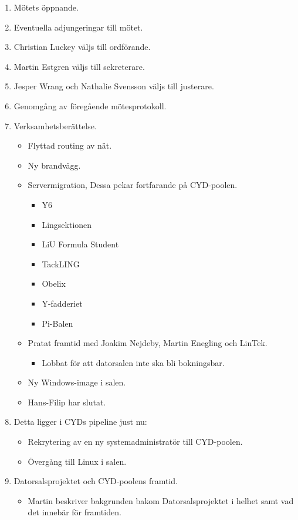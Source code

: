 \documentclass[a4paper,12pt]{article}
\begin{document}
\begin{enumerate}
\item Mötets öppnande.
\item Eventuella adjungeringar till mötet.
\item Christian Luckey väljs till ordförande.
\item Martin Estgren väljs till sekreterare.
\item Jesper Wrang och Nathalie Svensson väljs till justerare.
\item Genomgång av föregående mötesprotokoll.
\item Verksamhetsberättelse.
	\begin{itemize}
	\item Flyttad routing av nät.
	\item Ny brandvägg.
	\item Servermigration, Dessa pekar fortfarande på CYD-poolen.
		\begin{itemize}
		\item Y6
		\item Lingsektionen
		\item LiU Formula Student
		\item TackLING
		\item Obelix
		\item Y-fadderiet
		\item Pi-Balen
		\end{itemize}
	\item Pratat framtid med Joakim Nejdeby, Martin Enegling och LinTek.
		\begin{itemize}
		\item Lobbat för att datorsalen inte ska bli bokningsbar.
		\end{itemize}
	\item Ny Windows-image i salen.
	\item Hans-Filip har slutat.
	\end{itemize}
\item Detta ligger i CYDs pipeline just nu:
	\begin{itemize}
	\item Rekrytering av en ny systemadministratör till CYD-poolen.
	\item Övergång till Linux i salen.
	\end{itemize}
\item Datorsalsprojektet och CYD-poolens framtid.
	\begin{itemize}
		\item Martin beskriver bakgrunden bakom Datorsalsprojektet i helhet samt vad det innebär för framtiden.

\end{itemize}
\end{enumerate}
\end{document}
